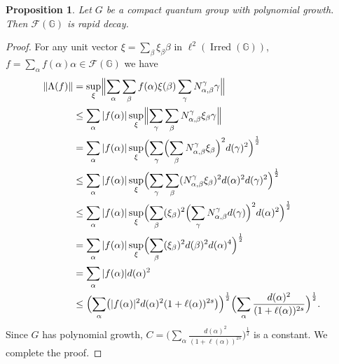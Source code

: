 \documentclass[12pt, reqno]{amsart}
\newtheorem{proposition}[theorem]{Proposition}
\theoremstyle{definition}
\theoremstyle{remark}
\numberwithin{equation}{section}
\begin{document}
\begin{proposition}\label{prposition rapid decay}
    Let \(G\) be a compact  quantum group with polynomial growth. 
    Then \(\mathcal{F}(\mathbb{G})\) is rapid decay.
\end{proposition}
\begin{proof}
    For any unit vector 
    \(\xi = \sum_{\beta} \xi_\beta \beta\) in 
    \(\ell^2(\operatorname{Irred}(\mathbb{G}))\), 
    \(f=\sum_\alpha f(\alpha)\alpha\in\mathcal{F}(\mathbb{G})\) we have
    \begin{align*}
        \|\Lambda(f)\|
        &= \sup_{\xi}\Bigl\| \sum_\alpha \sum_\beta f(\alpha)\xi(\beta) 
           \sum_\gamma N_{\alpha,\beta}^{\gamma} \gamma \Bigr\| \\
        &\leq \sum_\alpha |f(\alpha)| 
               \sup_{\xi}\Bigl\| \sum_\gamma \sum_\beta N_{\alpha,\beta}^{\gamma} 
               \xi_\beta \gamma \Bigr\| \\
        &= \sum_\alpha |f(\alpha)| 
               \sup_\xi\Bigl( \sum_\gamma \Bigl( \sum_\beta N_{\alpha,\beta}^{\gamma} 
               \xi_\beta \Bigr)^2 d(\gamma)^2 \Bigr)^{\frac{1}{2}} \\
        &\leq \sum_\alpha |f(\alpha)| 
                \sup_\xi\Bigl( \sum_\gamma \sum_\beta (N_{\alpha,\beta}^{\gamma} 
               \xi_\beta)^2 d(\alpha)^2 d(\gamma)^2  
               \Bigr)^{\frac{1}{2}} \\
        &\leq \sum_\alpha |f(\alpha)| 
                \sup_\xi\Bigl( \sum_\beta (\xi_\beta)^2 \Bigl( \sum_\gamma 
               N_{\alpha,\beta}^{\gamma} d(\gamma) \Bigr)^2 d(\alpha)^2 
               \Bigr)^{\frac{1}{2}} \\
        &= \sum_\alpha |f(\alpha)| 
            \sup_\xi\Bigl( \sum_\beta (\xi_\beta)^2 d(\beta)^2 d(\alpha)^4 
           \Bigr)^{\frac{1}{2}} \\
        &= \sum_\alpha |f(\alpha)| d(\alpha)^2 \\
        &\leq \Bigl( \sum_{\alpha} \bigl( |f(\alpha)|^2 d(\alpha)^2 
           (1+\ell(\alpha))^{2s} \bigr) \Bigr)^{\frac{1}{2}}
           \Bigl( \sum_{\alpha} \frac{d(\alpha)^2}{(1+\ell(\alpha))^{2s}} 
           \Bigr)^{\frac{1}{2}} .
    \end{align*}
    Since \(G\) has polynomial growth,
    \(C = \bigl( \sum_{\alpha} \frac{d(\alpha)^2}{(1+\ell(\alpha))^{2s}} 
    \bigr)^{\frac{1}{2}}\) is a constant. We complete the proof.
\end{proof}
\end{document}

